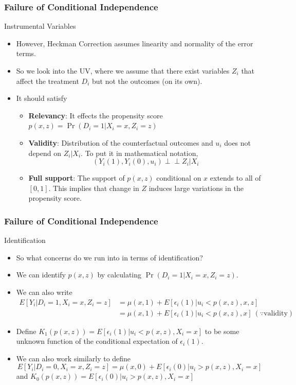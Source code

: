 \documentclass{beamer}
\begin{document}
\begin{frame}
\frametitle{Failure of Conditional Independence}
Instrumental Variables
\begin{itemize}
\item However, Heckman Correction assumes linearity and normality of the error terms.
\item So we look into the UV, where we assume that there exist variables $Z_i$ that affect the treatment $D_i$ but not the outcomes (on its own).
\item It should satisfy
\begin{itemize}
\item \textbf{Relevancy}: It effects the propensity score $p(x,z)=\Pr(D_i=1|X_i=x, Z_i=z)$
\item \textbf{Validity}: Distribution of the counterfactual outcomes and $u_i$ does not depend on $Z_i|X_i$. To put it in mathematical notation, 
\[
(Y_i(1), Y_i(0), u_i) \perp \!\!\!\perp Z_i|X_i
\]
\item \textbf{Full support}: The support of $p(x,z)$ conditional on $x$ extends to all of $[0,1]$. This implies that change in $Z$ induces large variations in the propensity score. 
\end{itemize} 
\end{itemize}
\end{frame}

\begin{frame}
\frametitle{Failure of Conditional Independence}
Identification
\begin{itemize}
\item  So what concerns do we run into in terms of identification? 
\item We can identify $p(x,z)$ by calculating $\Pr(D_i=1|X_i=x, Z_i=z)$. 
\item We can also write
\footnotesize{\begin{align*}
E[Y_i|D_i=1, X_i=x, Z_i=z]&=\mu(x,1)+E[\epsilon_i(1)|u_i<p(x,z), x, z]\\
&=\mu(x,1)+E[\epsilon_i(1)|u_i<p(x,z), x] \ (\because\text{validity})
\end{align*}}\normalsize
\item Define $K_1(p(x,z))=E[\epsilon_i(1)|u_i<p(x,z), X_i=x]$ to be some unknown function of the conditional expectation of $\epsilon_i(1)$. 
\item We can also work similarly to define 
\[
E[Y_i|D_i=0, X_i=x, Z_i=z]=\mu(x,0)+E[\epsilon_i(0)|u_i>p(x,z), X_i=x]
\] 
and $K_0(p(x,z))=E[\epsilon_i(0)|u_i>p(x,z), X_i=x]$
\end{itemize}
\end{frame}
\end{document}
